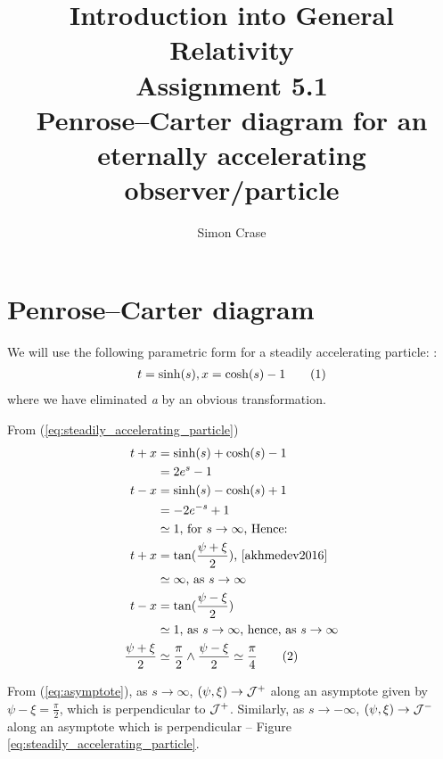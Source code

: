 \documentclass[]{article}
\title{Introduction into General Relativity\\Assignment 5.1\\Penrose--Carter diagram for an eternally accelerating observer/particle}
\author{Simon Crase}
\newcommand\numberthis{\addtocounter{equation}{1}\tag{\theequation}}
\begin{document}
\maketitle

\section{Penrose--Carter diagram}

We will use the following parametric form for a steadily accelerating particle: \cite[equation (7)]{akhmedev2016}:
\begin{align*}
t=\sinh(s), x=\cosh(s)-1 \numberthis\label{eq:steadily_accelerating_particle}
\end{align*}
where we have eliminated \emph{a} by an obvious transformation.

From (\ref{eq:steadily_accelerating_particle})
\begin{align*}
	t+x &= \sinh(s) + \cosh(s)-1\\
	&=2e^s-1\\
	t-x &= \sinh(s) - \cosh(s)+1\\
	&=-2e^{-s}+1\\
	&\simeq 1 \text{, for } s \rightarrow \infty \text{, Hence:}\\
	t+x &= \tan(\frac{\psi + \xi}{2}) \text{, \cite[V,2]{akhmedev2016}}\\
	&\simeq\infty \text{, as } s \rightarrow \infty \\
	t-x &= \tan(\frac{\psi - \xi}{2}) \\
	&\simeq 1 \text{, as } s \rightarrow \infty \text{, hence, as }  s \rightarrow \infty \\
	\frac{\psi + \xi}{2} &\simeq \frac{\pi}{2} \land \frac{\psi - \xi}{2} \simeq \frac{\pi}{4} \numberthis\label{eq:asymptote}
\end{align*}

From (\ref{eq:asymptote}), as $s \rightarrow \infty$, $(\psi,\xi) \rightarrow \cal{J}^+$ along an asymptote given by $\psi-\xi=\frac{\pi}{2}$, which is perpendicular to $\cal{J}^+$. Similarly, as $s \rightarrow -\infty$, $(\psi,\xi) \rightarrow \cal{J}^-$ along an asymptote which is perpendicular -- Figure \ref{eq:steadily_accelerating_particle}.
\end{document}
